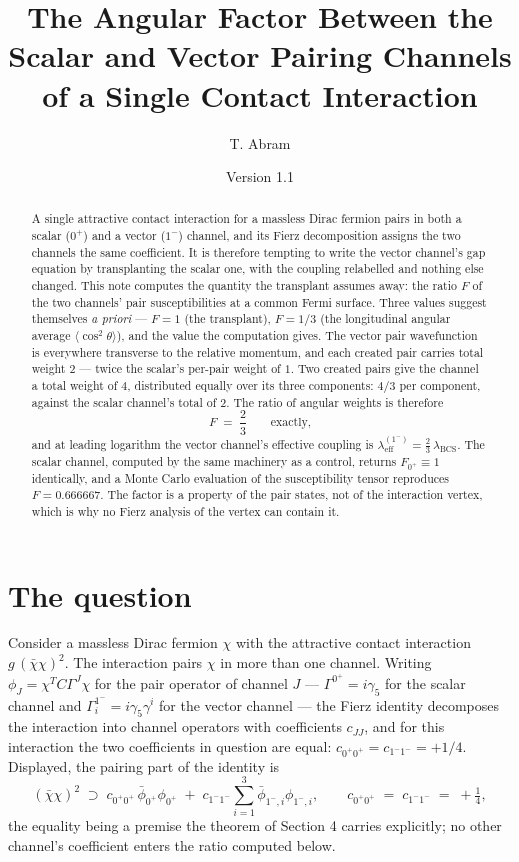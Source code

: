 \documentclass[11pt]{article}
\title{The Angular Factor Between the Scalar and Vector Pairing Channels of a Single Contact Interaction}
\author{T. Abram}
\date{Version 1.1}
\begin{document}
\maketitle

\begin{abstract}
A single attractive contact interaction for a massless Dirac fermion pairs in both a scalar ($0^+$) and a vector ($1^-$) channel, and its Fierz decomposition assigns the two channels the same coefficient. It is therefore tempting to write the vector channel's gap equation by transplanting the scalar one, with the coupling relabelled and nothing else changed. This note computes the quantity the transplant assumes away: the ratio $F$ of the two channels' pair susceptibilities at a common Fermi surface. Three values suggest themselves \emph{a priori} --- $F = 1$ (the transplant), $F = 1/3$ (the longitudinal angular average $\langle \cos^2\theta \rangle$), and the value the computation gives. The vector pair wavefunction is everywhere transverse to the relative momentum, and each created pair carries total weight $2$ --- twice the scalar's per-pair weight of $1$. Two created pairs give the channel a total weight of $4$, distributed equally over its three components: $4/3$ per component, against the scalar channel's total of $2$. The ratio of angular weights is therefore
\[
F \;=\; \frac{2}{3} \qquad \text{exactly,}
\]
and at leading logarithm the vector channel's effective coupling is $\lambda_{\mathrm{eff}}^{(1^-)} = \tfrac{2}{3}\,\lambda_{\mathrm{BCS}}$. The scalar channel, computed by the same machinery as a control, returns $F_{0^+} \equiv 1$ identically, and a Monte Carlo evaluation of the susceptibility tensor reproduces $F = 0.666667$. The factor is a property of the pair states, not of the interaction vertex, which is why no Fierz analysis of the vertex can contain it.
\end{abstract}

\section{The question}

Consider a massless Dirac fermion $\chi$ with the attractive contact interaction $g\,(\bar\chi\chi)^2$. The interaction pairs $\chi$ in more than one channel. Writing $\phi_J = \chi^T C \Gamma^J \chi$ for the pair operator of channel $J$ --- $\Gamma^{0^+} = i\gamma_5$ for the scalar channel and $\Gamma^{1^-}_i = i\gamma_5\gamma^i$ for the vector channel --- the Fierz identity decomposes the interaction into channel operators with coefficients $c_{JJ}$, and for this interaction the two coefficients in question are equal: $c_{0^+0^+} = c_{1^-1^-} = +1/4$. Displayed, the pairing part of the identity is
\[
(\bar\chi\chi)^2 \;\supset\; c_{0^+0^+}\, \bar\phi_{0^+}\phi_{0^+} \;+\; c_{1^-1^-} \sum_{i=1}^{3} \bar\phi_{1^-,i}\phi_{1^-,i},
\qquad c_{0^+0^+} \;=\; c_{1^-1^-} \;=\; +\tfrac{1}{4},
\]
the equality being a premise the theorem of Section 4 carries explicitly; no other channel's coefficient enters the ratio computed below.
\end{document}
